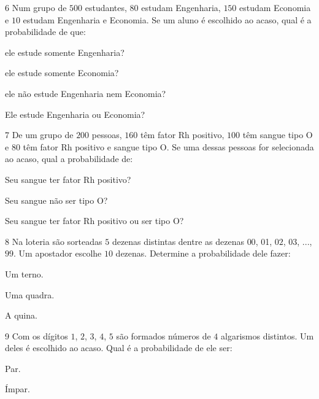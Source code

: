 \num{6}  Num grupo de $500$ estudantes, $80$ estudam Engenharia, $150$ estudam
Economia e $10$ estudam Engenharia e Economia. Se um aluno é escolhido ao
acaso, qual é a probabilidade de que:

\begin{escolha}
\item ele estude somente Engenharia? 
\item ele estude somente Economia? 
\item ele não estude Engenharia nem Economia? 
\item Ele estude Engenharia ou Economia? 
\end{escolha}


\num{7}  De um grupo de $200$ pessoas, $160$ têm fator Rh positivo, $100$ têm sangue
tipo O e $80$ têm fator Rh positivo e sangue tipo O. Se uma dessas pessoas
for selecionada ao acaso, qual a probabilidade de:

\begin{escolha}
\item Seu sangue ter fator Rh positivo? 
\item Seu sangue não ser tipo O? 
\item Seu sangue ter fator Rh positivo ou ser tipo O? 
\end{escolha}

\num{8}  Na loteria são sorteadas $5$ dezenas distintas dentre as dezenas $00$,
01, $02$, $03$, ..., $99$. Um apostador escolhe $10$ dezenas. Determine a
probabilidade dele fazer:

\begin{escolha}
\item Um terno. 
\item Uma quadra. 
\item A quina. 
\end{escolha}

\num{9}  Com os dígitos $1$, $2$, $3$, $4$, $5$ são formados números de $4$ algarismos
distintos. Um deles é escolhido ao acaso. Qual é a probabilidade de ele
ser:

\begin{escolha}
\item Par. 
\item Ímpar. 
\end{escolha}

